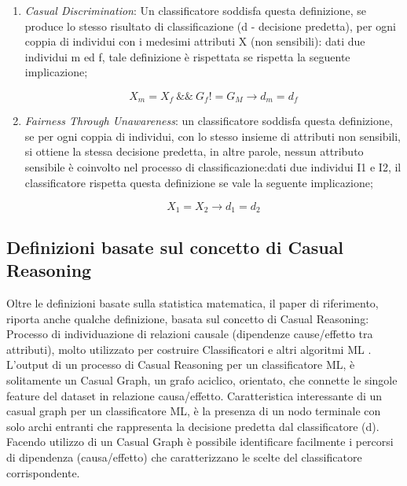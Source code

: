  \begin{enumerate}
     \item \emph{Casual Discrimination}: Un classificatore soddisfa questa definizione, se produce lo stesso risultato di classificazione (d - decisione predetta), per ogni coppia di individui con i medesimi attributi X (non sensibili): dati due individui m ed f, tale definizione è rispettata se rispetta la seguente implicazione;  
     
     
     \begin{equation*}
    X_m = X_f \ \&\& \ G_f != G_M \xrightarrow{} d_m = d_f
    \end{equation*} 

     \item \emph{Fairness Through Unawareness}: un classificatore soddisfa questa definizione, se per ogni coppia di individui, con lo stesso insieme di attributi non sensibili, si ottiene la stessa decisione predetta, in altre parole, nessun attributo sensibile è coinvolto nel processo di classificazione:dati due individui I1 e I2, il classificatore rispetta questa definizione se vale la seguente implicazione;  
     
         
     \begin{equation*}
        X_1 = X_2 \xrightarrow{} d_1 = d_2
    \end{equation*} 
 \end{enumerate}
 
 \subsection{Definizioni basate sul concetto di Casual Reasoning}
 Oltre le definizioni basate sulla statistica matematica, il paper di riferimento, riporta anche qualche definizione, basata sul concetto di Casual Reasoning: Processo di individuazione di relazioni causale (dipendenze cause/effetto tra attributi), molto utilizzato  per costruire Classificatori e altri algoritmi ML  \cite{FairnessDefinitionExplained}. L'output di un processo di Casual Reasoning per un classificatore ML, è solitamente un Casual Graph, un grafo aciclico, orientato, che connette le singole feature del dataset in relazione causa/effetto. Caratteristica interessante di un casual graph per un classificatore ML, è la presenza di un nodo terminale con solo archi entranti che rappresenta la decisione predetta dal classificatore (d). Facendo utilizzo di un Casual Graph è possibile identificare facilmente i percorsi di dipendenza (causa/effetto) che caratterizzano le scelte del classificatore corrispondente.
 
